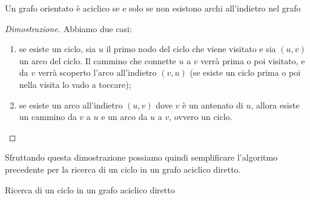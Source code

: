 \begin{theorem*}
Un grafo orientato è aciclico se e solo se non esistono archi all'indietro nel grafo
\end{theorem*}

\begin{proof}[Dimostrazione]
Abbiamo due casi:
\begin{enumerate}
	\item se esiste un ciclo, sia \(u\) il primo nodo del ciclo che viene visitato e sia \((u,v)\) un arco del ciclo.
	Il cammino che connette \(u\) a \(v\) verrà prima o poi visitato, e da \(v\) verrà scoperto l'arco all'indietro \((v, u)\) (se esiste un ciclo prima o poi nella visita lo vado a toccare);
	\item se esiste un arco all'indietro \((u,v)\) dove \(v\) è un antenato di \(u\), allora esiste un cammino da \(v\) a \(u\) e un arco da \(u\) a \(v\), ovvero un ciclo.
\end{enumerate}
\end{proof}
Sfruttando questa dimostrazione possiamo quindi semplificare l'algoritmo precedente per la ricerca di un ciclo in un grafo aciclico diretto.

\begin{algorithm}[H]
	\caption[toc]{Ricerca di un ciclo in un grafo aciclico diretto}
	
\end{algorithm}

